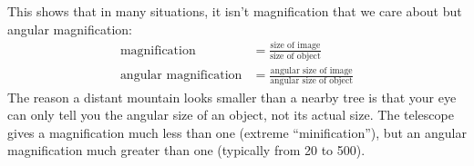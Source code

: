 This shows that in many situations, it isn't magnification that we care about but
angular magnification:
\begin{align*}
	\text{magnification}	&= \frac{\text{size of image}}{\text{size of object}}\\
	\text{angular magnification}	&= \frac{\text{angular size of image}}{\text{angular size of object}}
\end{align*}
The reason a distant mountain looks smaller than a nearby tree is that your eye can
only tell you the angular size of an object, not its actual size. The telescope gives
a magnification much less than one (extreme ``minification''), but an angular magnification
much greater than one (typically from 20 to 500).
\vfill
